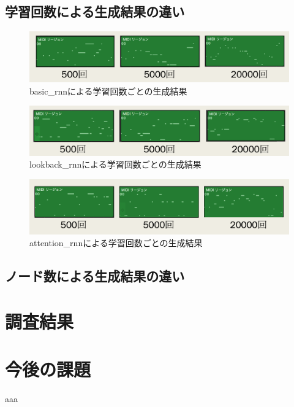 \subsection{学習回数による生成結果の違い}
\begin{figure}[h]
    \begin{screen}
    \begin{center}
        \includegraphics[scale=0.68, clip]{./img/basicMIDI.png}
        \caption{basic\_rnnによる学習回数ごとの生成結果}
        \label{fig:basic_rnnによる学習回数ごとの生成結果}
    \end{center}
    \end{screen}
\end{figure}
\begin{figure}[h]
    \begin{screen}
    \begin{center}
        \includegraphics[scale=0.68, clip]{./img/lookbackMIDI.png}
        \caption{lookback\_rnnによる学習回数ごとの生成結果}
        \label{fig:lookback_rnnによる学習回数ごとの生成結果}
    \end{center}
    \end{screen}
\end{figure}
\begin{figure}[h]
    \begin{screen}
    \begin{center}
        \includegraphics[scale=0.68, clip]{./img/attentionMIDI.png}
        \caption{attention\_rnnによる学習回数ごとの生成結果}
        \label{fig:attention_rnnによる学習回数ごとの生成結果}
    \end{center}
    \end{screen}
\end{figure}
  
\subsection{ノード数による生成結果の違い}
\section{調査結果}

\newpage

\section{今後の課題}
aaa\\